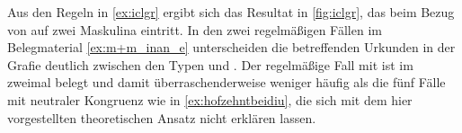 











Aus den Regeln in \cref{ex:iclgr} ergibt sich das Resultat in \cref{fig:iclgr},
das beim Bezug von  auf zwei Maskulina eintritt. In den zwei
regelmäßigen Fällen im Belegmaterial \cref{ex:m+m_inan_e} unterscheiden die
betreffenden Urkunden in der Grafie deutlich zwischen den Typen  und
. Der regelmäßige Fall mit  ist im \CAO{} zweimal
belegt und damit über\-raschender\-weise weniger häufig als die fünf Fälle mit
neutraler Kongruenz wie in \cref{ex:hofzehntbeidiu}, die sich mit dem hier
vorgestellten theoretischen Ansatz nicht erklären lassen.

